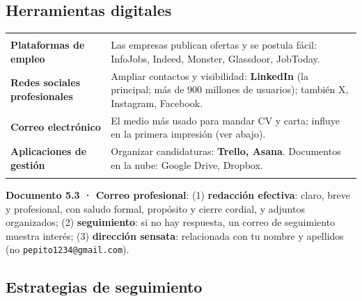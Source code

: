\subsection{Herramientas digitales}
\begin{tabla}
\begin{tabularx}{\textwidth}{@{}>{\bfseries}p{3.1cm} Y@{}}
 &  \\
\midrule
Plataformas de empleo & Las empresas publican ofertas y se postula fácil: InfoJobs, Indeed, Monster, Glassdoor, JobToday. \\
Redes sociales profesionales & Ampliar contactos y visibilidad: \textbf{LinkedIn} (la principal; más de 900 millones de usuarios); también X, Instagram, Facebook. \\
Correo electrónico & El medio más usado para mandar CV y carta; influye en la primera impresión (ver abajo). \\
Aplicaciones de gestión & Organizar candidaturas: \textbf{Trello, Asana}. Documentos en la nube: Google Drive, Dropbox. \\
\bottomrule
\end{tabularx}
\end{tabla}
\textbf{Documento 5.3 · Correo profesional}: (1) \textbf{redacción efectiva}: claro, breve y profesional, con saludo formal, propósito y cierre cordial, y adjuntos organizados; (2) \textbf{seguimiento}: si no hay respuesta, un correo de seguimiento muestra interés; (3) \textbf{dirección sensata}: relacionada con tu nombre y apellidos (no \texttt{pepito1234@gmail.com}).

\subsection{Estrategias de seguimiento}
\begin{center}
\end{center}

